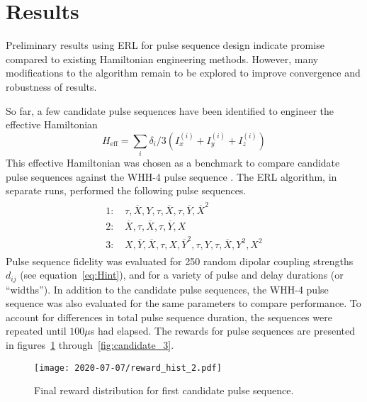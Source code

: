 \documentclass{article}
\begin{document}
\section{Results}


Preliminary results using ERL for pulse sequence design indicate promise compared to existing Hamiltonian engineering methods. However, many modifications to the algorithm remain to be explored to improve convergence and robustness of results.

So far, a few candidate pulse sequences have been identified to engineer the effective Hamiltonian
\begin{equation}
    H_\text{eff} = \sum_i \delta_i/3 (I_x^{(i)} + I_y^{(i)} + I_z^{(i)})
\end{equation}
This effective Hamiltonian was chosen as a benchmark to compare candidate pulse sequences against the WHH-4 pulse sequence \cite{PhysRevLett.20.180}. The ERL algorithm, in separate runs, performed the following pulse sequences.
\begin{align}\label{eq:candidate_seq}
\begin{split}
    1: \, & \tau, \overline{X}, Y, \tau, \overline{X}, \tau, \overline{Y}, \overline{X}^2 \\
    2: \, & \overline{X}, \tau, \overline{X}, \tau, \overline{Y}, X \\
    3: \, & X, \overline{Y}, \overline{X}, \tau, X, \overline{Y}^2, \tau,
        Y, \tau, \overline{X}, Y^2, X^2
\end{split}
\end{align}
Pulse sequence fidelity was evaluated for 250 random dipolar coupling strengths $d_{ij}$ (see equation~\ref{eq:Hint}), and for a variety of pulse and delay durations (or ``widths''). In addition to the candidate pulse sequences, the WHH-4 pulse sequence was also evaluated for the same parameters to compare performance. To account for differences in total pulse sequence duration, the sequences were repeated until $100\mu$s had elapsed. The rewards for  pulse sequences are presented in figures~\ref{fig:candidate_1} through~\ref{fig:candidate_3}.

\begin{figure}[H]
    \centering
    \texttt{[image: 2020-07-07/reward\_hist\_2.pdf]}
    \caption{Final reward distribution for first candidate pulse sequence.}
    \label{fig:candidate_1}
\end{figure}
\end{document}
